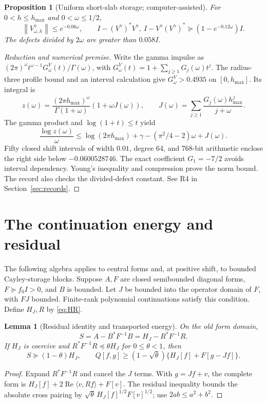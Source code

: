 \documentclass[11pt]{article}
\newtheorem{proposition}[theorem]{Proposition}
\newtheorem{lemma}[theorem]{Lemma}
\theoremstyle{remark}\newtheorem{remark}[theorem]{Remark}
\newcommand{\Rea}{\operatorname{Re}}
\newcommand{\norm}[1]{\left\|#1\right\|}
\newcommand{\ip}[2]{\langle #1,#2\rangle}
\begin{document}
\begin{proposition}[Uniform short-slab storage; computer-assisted]\label{prop:slab}
For $0<h\le h_{\max}$ and $0<\omega\le1/2$,
\[
 \norm{V^\gamma_{\omega,h}}\le e^{-0.06\omega},\qquad
 I-(V^\gamma)^*V^\gamma,\ I-V^\gamma(V^\gamma)^*\succeq(1-e^{-0.12\omega})I.
\]
The defects divided by $2\omega$ are greater than $0.058I$.
\end{proposition}
\begin{proof}[Reduction and numerical premise]
Write the gamma impulse as $(2\pi)^\omega t^{\omega-1}G^V_\omega(t)/\Gamma(\omega)$, with $G^V_\omega(t)=1+\sum_{j\ge1}G_j(\omega)t^j$. The radius-three profile bound and an interval calculation give $G^V_\omega>0.4935$ on $[0,h_{\max}]$. Its integral is
\[
 z(\omega)=\frac{(2\pi h_{\max})^\omega}{\Gamma(1+\omega)}
 (1+\omega J(\omega)),\qquad J(\omega)=\sum_{j\ge1}\frac{G_j(\omega)h_{\max}^j}{j+\omega}.
\]
The gamma product and $\log(1+t)\le t$ yield
\[
 \frac{\log z(\omega)}\omega\le\log(2\pi h_{\max})+\gamma
 -(\pi^2/4-2)\omega+J(\omega).
\]
Fifty closed shift intervals of width $0.01$, degree 64, and 768-bit arithmetic enclose the right side below $-0.0600528746$. The exact coefficient $G_1=-7/2$ avoids interval dependency. Young's inequality and compression prove the norm bound. The record also checks the divided-defect constant. See R4 in Section~\ref{sec:records}.
\end{proof}

\section{The continuation energy and residual}\label{sec:residual}

The following algebra applies to central forms and, at positive shift, to bounded Cayley-storage blocks. Suppose $A,F$ are closed semibounded diagonal forms, $F\succeq f_0I>0$, and $B$ is bounded. Let $J$ be bounded into the operator domain of $F$, with $FJ$ bounded. Finite-rank polynomial continuations satisfy this condition. Define $H_J,R$ by \eqref{eq:HR}.

\begin{lemma}[Residual identity and transported energy]\label{lem:residual}
On the old form domain,
\begin{equation}\label{eq:residualidentity}
 S=A-B^*F^{-1}B=H_J-R^*F^{-1}R.
\end{equation}
If $H_J$ is coercive and $R^*F^{-1}R\preceq\theta H_J$ for $0\le\theta<1$, then
\[
 S\succeq(1-\theta)H_J,\qquad
 Q[f,g]\ge(1-\sqrt\theta)\{H_J[f]+F[g-Jf]\}.
\]
\end{lemma}
\begin{proof}
Expand $R^*F^{-1}R$ and cancel the $J$ terms. With $g=Jf+v$, the complete form is $H_J[f]+2\Rea\ip v{Rf}+F[v]$. The residual inequality bounds the absolute cross pairing by $\sqrt\theta\,H_J[f]^{1/2}F[v]^{1/2}$; use $2ab\le a^2+b^2$.
\end{proof}
\end{document}
